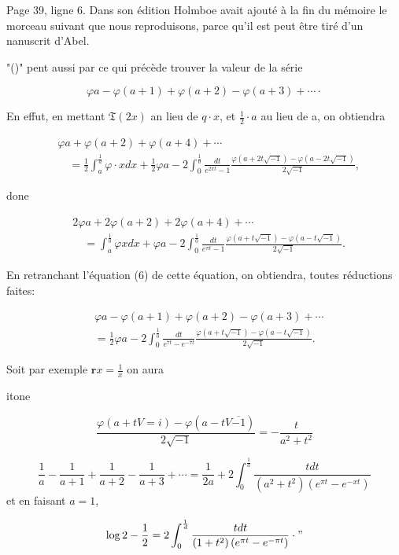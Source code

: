 \documentclass{article}
\begin{document}
Page 39, ligne 6. Dans son édition Holmboe avait ajouté à la fin du mémoire le morceau suivant que nous reproduisons, parce qu'il est peut être tiré d'un nanuscrit d'Abel.

"()" pent aussi par ce qui précède trouver la valeur de la série

\[
\varphi a-\varphi(a+1)+\varphi(a+2)-\varphi(a+3)+\cdots \cdot
\]

En effut, en mettant \(\mathfrak{T}(2 x)\) an lieu de \(q \cdot x\), et \(\frac{1}{2} \cdot a\) au lieu de a, on obtiendra

\[
\begin{aligned}
& \varphi a+\varphi(a+2)+\varphi(a+4)+\cdots \\
& \quad=\frac{1}{2} \int_{a}^{\frac{1}{d}} \varphi \cdot x d x+\frac{1}{2} \varphi a-2 \int_{0}^{\frac{1}{0}} \frac{d t}{e^{2 \pi t}-1} \frac{\varphi(a+2 t \sqrt{-1})-\varphi(a-2 t \sqrt{-1})}{2 \sqrt{-1}},
\end{aligned}
\]

done

\[
\begin{aligned}
& 2 \varphi a+2 \varphi(a+2)+2 \varphi(a+4)+\cdots \\
& \quad=\int_{a}^{\frac{1}{0}} \varphi x d x+\varphi a-2 \int_{0}^{\frac{1}{0}} \frac{d t}{e^{\pi t}-1} \frac{\varphi(a+t \sqrt{-1})-\varphi(a-t \sqrt{-1})}{2 \sqrt{-1}} .
\end{aligned}
\]

En retranchant l'équation (6) de cette équation, on obtiendra, toutes réductions faites:

\[
\begin{aligned}
& \varphi a-\varphi(a+1)+\varphi(a+2)-\varphi(a+3)+\cdots \\
&=\frac{1}{2} \varphi a-2 \int_{0}^{\frac{1}{0}} \frac{d t}{e^{7 t}-e^{-7 t}} \frac{\varphi(a+t \sqrt{-1})-\varphi(a-t \sqrt{-1})}{2 \sqrt{-1}} .
\end{aligned}
\]

Soit par exemple \(\boldsymbol{r} x=\frac{1}{x}\) on aura

itone

\[
\frac{\varphi(a+t V=i)-\varphi(a-t V \overline{-1})}{2 \sqrt{-1}}=-\frac{t}{a^{2}+t^{2}}
\]

\[
\frac{1}{a}-\frac{1}{a+1}+\frac{1}{a+2}-\frac{1}{a+3}+\cdots=\frac{1}{2 a}+2 \int_{0}^{\frac{1}{a}} \frac{t d t}{\left(a^{2}+t^{2}\right)\left(e^{\pi t}-e^{-x t}\right)}
\]
et en faisant \(a=1\),

\[
\log 2-\frac{1}{2}=2 \int_{0}^{\frac{1}{d}} \frac{t d t}{\left(1+t^{2}\right)\left(e^{\pi t}-e^{-\pi t}\right)} \cdot "
\]
\end{document}
